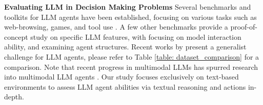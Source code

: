 
\textbf{Evaluating LLM in Decision Making Problems}
Several benchmarks and toolkits for LLM agents have been established, focusing on various tasks such as web-browsing, games, and tool use \citep{yao2022webshop, zhou2023webarena, shridhar2020alfworld, qin2023tool, wang2023voyager, ye2024tooleyes, kinniment2023evaluating}. A few other benchmarks provide a proof-of-concept study on specific LLM features, with \citet{wang2023mint} focusing on model interaction ability, and \citet{liu2023bolaa} examining agent structures. Recent works by \citet{liu2023agentbench, wu2023smartplay, mialon2023gaia} present a generalist challenge for LLM agents, please refer to Table \ref{table: dataset_comparison} for a comparison. 
Note that recent progress in multimodal LLMs has spurred research into multimodal LLM agents \citep{Zheng2024GPT4VisionIA, yang2023appagent}. Our study focuses exclusively on text-based environments to assess LLM agent abilities via textual reasoning and actions in-depth.







